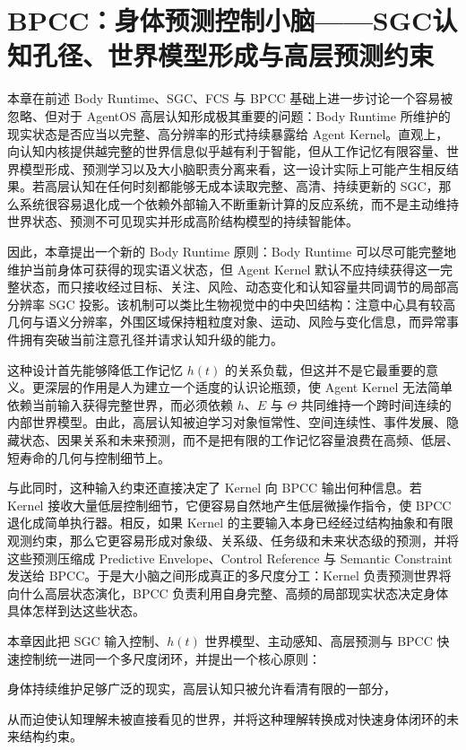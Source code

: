 \chapter{BPCC：身体预测控制小脑——SGC认知孔径、世界模型形成与高层预测约束}

\begin{chapterlead}
本章在前述 Body Runtime、SGC、FCS 与 BPCC 基础上进一步讨论一个容易被忽略、但对于 AgentOS 高层认知形成极其重要的问题：Body Runtime 所维护的现实状态是否应当以完整、高分辨率的形式持续暴露给 Agent Kernel。直观上，向认知内核提供越完整的世界信息似乎越有利于智能，但从工作记忆有限容量、世界模型形成、预测学习以及大小脑职责分离来看，这一设计实际上可能产生相反结果。若高层认知在任何时刻都能够无成本读取完整、高清、持续更新的 SGC，那么系统很容易退化成一个依赖外部输入不断重新计算的反应系统，而不是主动维持世界状态、预测不可见现实并形成高阶结构模型的持续智能体。

因此，本章提出一个新的 Body Runtime 原则：Body Runtime 可以尽可能完整地维护当前身体可获得的现实语义状态，但 Agent Kernel 默认不应持续获得这一完整状态，而只接收经过目标、关注、风险、动态变化和认知容量共同调节的局部高分辨率 SGC 投影。该机制可以类比生物视觉中的中央凹结构：注意中心具有较高几何与语义分辨率，外围区域保持粗粒度对象、运动、风险与变化信息，而异常事件拥有突破当前注意孔径并请求认知升级的能力。

这种设计首先能够降低工作记忆 $h(t)$ 的关系负载，但这并不是它最重要的意义。更深层的作用是人为建立一个适度的认识论瓶颈，使 Agent Kernel 无法简单依赖当前输入获得完整世界，而必须依赖 $h$、$E$ 与 $\Theta$ 共同维持一个跨时间连续的内部世界模型。由此，高层认知被迫学习对象恒常性、空间连续性、事件发展、隐藏状态、因果关系和未来预测，而不是把有限的工作记忆容量浪费在高频、低层、短寿命的几何与控制细节上。

与此同时，这种输入约束还直接决定了 Kernel 向 BPCC 输出何种信息。若 Kernel 接收大量低层控制细节，它便容易自然地产生低层微操作指令，使 BPCC 退化成简单执行器。相反，如果 Kernel 的主要输入本身已经经过结构抽象和有限观测约束，那么它更容易形成对象级、关系级、任务级和未来状态级的预测，并将这些预测压缩成 Predictive Envelope、Control Reference 与 Semantic Constraint 发送给 BPCC。于是大小脑之间形成真正的多尺度分工：Kernel 负责预测世界将向什么高层状态演化，BPCC 负责利用自身完整、高频的局部现实状态决定身体具体怎样到达这些状态。

本章因此把 SGC 输入控制、$h(t)$ 世界模型、主动感知、高层预测与 BPCC 快速控制统一进同一个多尺度闭环，并提出一个核心原则：

\begin{statementbox}
身体持续维护足够广泛的现实，高层认知只被允许看清有限的一部分，
\end{statementbox}

\begin{statementbox}
从而迫使认知理解未被直接看见的世界，并将这种理解转换成对快速身体闭环的未来结构约束。
\end{statementbox}
\end{chapterlead}

